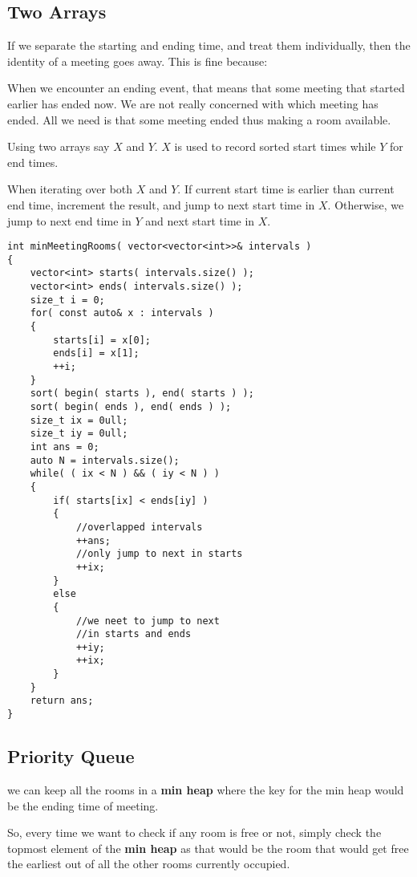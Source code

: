\subsection{Two Arrays}

If we separate the starting and ending time, and treat them individually, then the identity of a meeting goes away. This is fine because:

When we encounter an ending event, that means that some meeting that started earlier has ended now. We are not really concerned with which meeting has ended. All we need is that some meeting ended thus making a room available.

Using two arrays say $X$ and $Y$. $X$ is used to record sorted start times while $Y$ for end times. 

When iterating over both $X$ and $Y$. If current start time is earlier than current end time, increment the result, and jump to next start time in $X$. Otherwise, we jump to next end time in $Y$ and next start time in $X$.

\begin{lstlisting}[style=customc, caption={Two Arrays}]
int minMeetingRooms( vector<vector<int>>& intervals )
{
    vector<int> starts( intervals.size() );
    vector<int> ends( intervals.size() );
    size_t i = 0;
    for( const auto& x : intervals )
    {
        starts[i] = x[0];
        ends[i] = x[1];
        ++i;
    }
    sort( begin( starts ), end( starts ) );
    sort( begin( ends ), end( ends ) );
    size_t ix = 0ull;
    size_t iy = 0ull;
    int ans = 0;
    auto N = intervals.size();
    while( ( ix < N ) && ( iy < N ) )
    {
        if( starts[ix] < ends[iy] )
        {
            //overlapped intervals
            ++ans;
            //only jump to next in starts
            ++ix;
        }
        else
        {
            //we neet to jump to next
            //in starts and ends
            ++iy;
            ++ix;
        }
    }
    return ans;
}
\end{lstlisting}

\subsection{Priority Queue}

we can keep all the rooms in a \textbf{min heap} where the key for the min heap would be the ending time of meeting.

So, every time we want to check if any room is free or not, simply check the topmost element of the \textbf{min heap} as that would be the room that would get free the earliest out of all the other rooms currently occupied.

